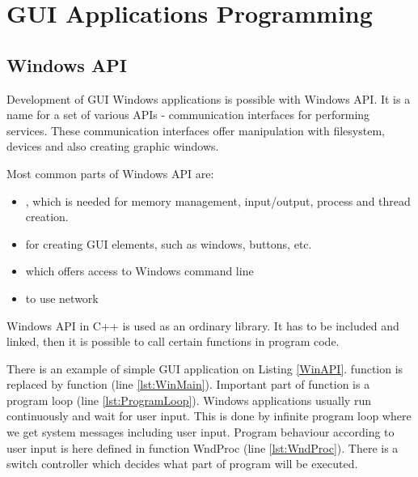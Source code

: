 \chapter*{GUI Applications Programming}
\vspace{-10mm}

\section*{Windows API}

Development of GUI Windows applications is possible with Windows API. It is a name for a set of various APIs - communication interfaces for performing services. These communication interfaces offer manipulation with filesystem, devices and also creating graphic windows.

Most common parts of Windows API are:
\begin{itemize}
\item {}, which is needed for memory management, input/output, process and thread creation.
\item {} for creating GUI elements, such as windows, buttons, etc.
\item {} which offers access to Windows command line
\item {} to use network
\end{itemize}

Windows API in C++ is used as an ordinary library. It has to be included and linked, then it is possible to call certain functions in program code.

There is an example of simple GUI application on Listing \ref{WinAPI}.  function is replaced by  function (line \ref{lst:WinMain}). Important part of  function is a program loop (line \ref{lst:ProgramLoop}). Windows applications usually run continuously and wait for user input. This is done by infinite program loop where we get system messages including user input. Program behaviour according to user input is here defined in function WndProc (line \ref{lst:WndProc}). There is a switch controller which decides what part of program will be executed.

